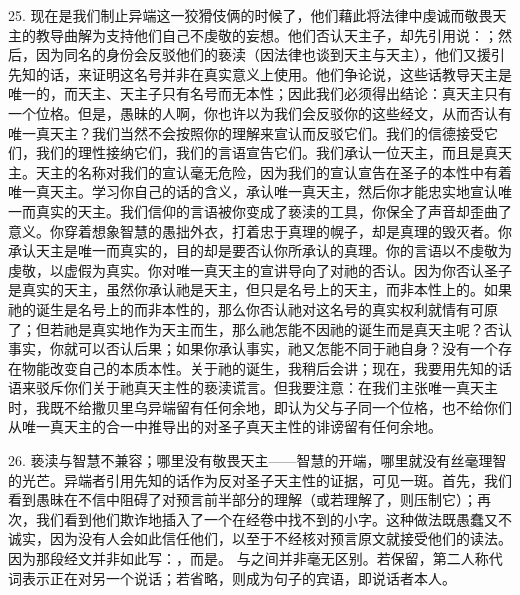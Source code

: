 25. 现在是我们制止异端这一狡猾伎俩的时候了，他们藉此将法律中虔诚而敬畏天主的教导曲解为支持他们自己不虔敬的妄想。他们否认天主子，却先引用说：；然后，因为同名的身份会反驳他们的亵渎（因法律也谈到天主与天主），他们又援引先知的话，来证明这名号并非在真实意义上使用。他们争论说，这些话教导天主是唯一的，而天主、天主子只有名号而无本性；因此我们必须得出结论：真天主只有一个位格。但是，愚昧的人啊，你也许以为我们会反驳你的这些经文，从而否认有唯一真天主？我们当然不会按照你的理解来宣认而反驳它们。我们的信德接受它们，我们的理性接纳它们，我们的言语宣告它们。我们承认一位天主，而且是真天主。天主的名称对我们的宣认毫无危险，因为我们的宣认宣告在圣子的本性中有着唯一真天主。学习你自己的话的含义，承认唯一真天主，然后你才能忠实地宣认唯一而真实的天主。我们信仰的言语被你变成了亵渎的工具，你保全了声音却歪曲了意义。你穿着想象智慧的愚拙外衣，打着忠于真理的幌子，却是真理的毁灭者。你承认天主是唯一而真实的，目的却是要否认你所承认的真理。你的言语以不虔敬为虔敬，以虚假为真实。你对唯一真天主的宣讲导向了对祂的否认。因为你否认圣子是真实的天主，虽然你承认祂是天主，但只是名号上的天主，而非本性上的。如果祂的诞生是名号上的而非本性的，那么你否认祂对这名号的真实权利就情有可原了；但若祂是真实地作为天主而生，那么祂怎能不因祂的诞生而是真天主呢？否认事实，你就可以否认后果；如果你承认事实，祂又怎能不同于祂自身？没有一个存在物能改变自己的本质本性。关于祂的诞生，我稍后会讲；现在，我要用先知的话语来驳斥你们关于祂真天主性的亵渎谎言。但我要注意：在我们主张唯一真天主时，我既不给撒贝里乌异端留有任何余地，即认为父与子同一个位格，也不给你们从唯一真天主的合一中推导出的对圣子真天主性的诽谤留有任何余地。\par

26. 亵渎与智慧不兼容；哪里没有敬畏天主——智慧的开端，哪里就没有丝毫理智的光芒。异端者引用先知的话作为反对圣子天主性的证据，可见一斑。首先，我们看到愚昧在不信中阻碍了对预言前半部分的理解（或若理解了，则压制它）；再次，我们看到他们欺诈地插入了一个在经卷中找不到的小字。这种做法既愚蠢又不诚实，因为没有人会如此信任他们，以至于不经核对预言原文就接受他们的读法。因为那段经文并非如此写：，而是。 与之间并非毫无区别。若保留，第二人称代词表示正在对另一个说话；若省略，则成为句子的宾语，即说话者本人。\par

